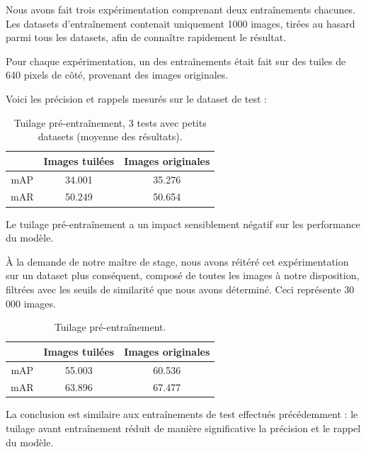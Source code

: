 Nous avons fait trois expérimentation comprenant deux entraînements chacunes.
Les datasets d'entraînement contenait uniquement 1000 images, tirées au hasard parmi tous les datasets,
afin de connaître rapidement le résultat.

Pour chaque expérimentation, un des entraînements était fait sur des tuiles de 640 pixels de côté,
provenant des images originales.

Voici les précision et rappels mesurés sur le dataset de test :\\

\begin{table}[h]
    \begin{center}
        \begin{tabular}{c c c}
            \hline
            & Images tuilées & Images originales \\
            \hline
            mAP & 34.001 & 35.276 \\
            mAR & 50.249 & 50.654 \\
        \end{tabular}
    \end{center}
    \caption{Tuilage pré-entraînement, 3 tests avec petits datasets (moyenne des résultats).}
\end{table}

Le tuilage pré-entraînement a un impact sensiblement négatif sur les performance du modèle.

À la demande de notre maître de stage, nous avons réitéré cet expérimentation sur un
dataset plus conséquent, composé de toutes les images à notre disposition, filtrées
avec les seuils de similarité que nous avons déterminé. Ceci représente
30 000 images.

\begin{table}[h]
    \begin{center}
        \begin{tabular}{c c c}
            \hline
            & Images tuilées & Images originales \\
            \hline
            mAP & 55.003 & 60.536 \\
            mAR & 63.896 & 67.477 \\
        \end{tabular}
    \end{center}
    \caption{Tuilage pré-entraînement.}
\end{table}

La conclusion est similaire aux entraînements de test effectués précédemment :
le tuilage avant entraînement réduit de manière significative la précision et
le rappel du modèle.

